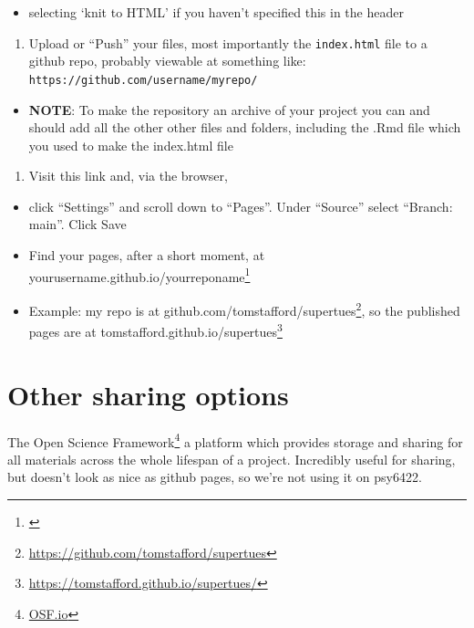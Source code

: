 \documentclass[
  12pt,
  a5paper,
]{book}
\DeclareRobustCommand{\href}[2]{#2\footnote{\url{#1}}}
\providecommand{\tightlist}{%
  \setlength{\itemsep}{0pt}\setlength{\parskip}{0pt}}
\begin{document}
\begin{itemize}
\tightlist
\item
  selecting `knit to HTML' if you haven't specified this in the header
\end{itemize}

\begin{enumerate}
\def\labelenumi{\arabic{enumi}.}
\setcounter{enumi}{4}
\tightlist
\item
  Upload or ``Push'' your files, most importantly the \texttt{index.html} file to a github repo, probably viewable at something like: \texttt{https://github.com/username/myrepo/}
\end{enumerate}

\begin{itemize}
\tightlist
\item
  \textbf{NOTE}: To make the repository an archive of your project you can and should add all the other other files and folders, including the .Rmd file which you used to make the index.html file
\end{itemize}

\begin{enumerate}
\def\labelenumi{\arabic{enumi}.}
\setcounter{enumi}{5}
\tightlist
\item
  Visit this link and, via the browser,
\end{enumerate}

\begin{itemize}
\tightlist
\item
  click ``Settings'' and scroll down to ``Pages''. Under ``Source'' select ``Branch: main''. Click Save
\item
  Find your pages, after a short moment, at \href{}{yourusername.github.io/yourreponame}
\item
  Example: my repo is at \href{https://github.com/tomstafford/supertues}{github.com/tomstafford/supertues}, so the published pages are at \href{https://tomstafford.github.io/supertues/}{tomstafford.github.io/supertues}
\end{itemize}

\hypertarget{other-sharing-options}{%
\section{Other sharing options}\label{other-sharing-options}}

\href{OSF.io}{The Open Science Framework} a platform which provides storage and sharing for all materials across the whole lifespan of a project. Incredibly useful for sharing, but doesn't look as nice as github pages, so we're not using it on psy6422.
\end{document}
